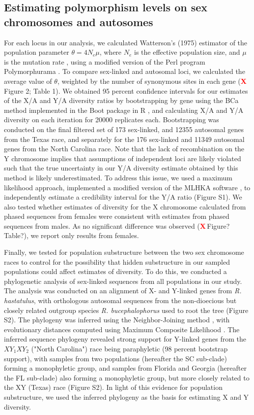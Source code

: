 \documentclass[9pt,twocolumn,twoside]{gsajnl}
\newcommand{\X}{\textcolor{red}{\bf X\,}}
\begin{document}
\subsection*{Estimating polymorphism levels on sex chromosomes and autosomes}
For each locus in our analysis, we calculated Watterson’s (1975) estimator of the population parameter $\theta=4N_{e}\mu$, where $N_{e}$ is the effective population size, and $\mu$ is the mutation rate \citep{watterson1975}, using a modified version of the Perl program Polymorphurama \citep{bachtrog2006}. To compare sex-linked and autosomal loci, we calculated the average value of $\theta$, weighted by the number of synonymous sites in each gene (\X Figure 2; Table 1). We obtained 95 percent confidence intervals for our estimates of the X/A and Y/A diversity ratios by bootstrapping by gene using the BCa method \citep{efron1994} implemented in the Boot package in R \citep{canty2012boot}, and calculating X/A and Y/A diversity on each iteration for 20000 replicates each. Bootstrapping was conducted on the final filtered set of 173 sex-linked, and 12355 autosomal genes from the Texas race, and separately for the 176 sex-linked and 11349 autosomal genes from the North Carolina race. Note that the lack of recombination on the Y chromosome implies that assumptions of independent loci are likely violated such that the true uncertainty in our Y/A diversity estimate obtained by this method is likely underestimated. To address this issue, we used a maximum likelihood approach, implemented a modified version of the MLHKA software \citep{wright2004hka}, to independently estimate a credibility interval for the Y/A ratio (Figure S1). We also tested whether estimates of diversity for the X chromosome calculated from phased sequences from females were consistent with estimates from phased sequences from males. As no significant difference was observed (\X Figure? Table?), we report only results from females.

Finally, we tested for population substructure between the two sex chromosome races to control for the possibility that hidden substructure in our sampled populations could affect estimates of diversity. To do this, we conducted a phylogenetic analysis of sex-linked sequences from all populations in our study. The analysis was conducted on an alignment of X- and Y-linked genes from \textit{R. hastatulus}, with orthologous autosomal sequences from the non-dioecious but closely related outgroup species \textit{R. bucephalophorus} used to root the tree (Figure S2). The phylogeny was inferred using the Neighbor-Joining method \citep{saitou1987neighbor}, with evolutionary distances computed using Maximum Composite Likelihood \citep{tamura2011mega5}. The inferred sequence phylogeny revealed strong support for Y-linked genes from the $XY_{1}XY_{2}$ ("North Carolina") race being paraphyletic (98 percent bootstrap support), with samples from two populations (hereafter the SC sub-clade) forming a monophyletic group, and samples from Florida and Georgia (hereafter the FL sub-clade) also forming a monophyletic group, but more closely related to the XY (Texas) race (Figure S2). In light of this evidence for population substructure, we used the inferred phylogeny as the basis for estimating X and Y diversity.  
\end{document}
